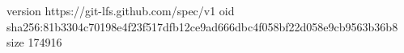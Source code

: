 version https://git-lfs.github.com/spec/v1
oid sha256:81b3304c70198e4f23f517dfb12ce9ad666dbc4f058bf22d058e9cb9563b36b8
size 174916
